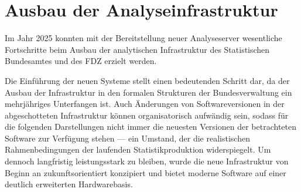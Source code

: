 \documentclass[
  german,
  10pt,
  twoside]{article}
\makeatletter
\newcommand{\berlintime}{%
  \berlinhr=\time\relax
  \divide\berlinhr by 60\relax
  \berlinmin=\time\relax
  \multiply\berlinhr by -60\relax
  \advance\berlinmin by \berlinhr\relax
  \berlinhr=\time\relax
  \divide\berlinhr by 60\relax
  \advance\berlinhr by 1\relax
  \ifnum\berlinhr>23\relax
    \advance\berlinhr by -24\relax
  \fi
  \ifnum\berlinhr<10 0\fi\the\berlinhr:\ifnum\berlinmin<10 0\fi\the\berlinmin%
}
\newif\ifdraftmode
\providecommand{\totalchars}{0}
\providecommand{\totalwords}{0}
\providecommand{\abstractchars}{0}
\providecommand{\abstractwords}{0}
\providecommand{\zusammenfassungchars}{0}
\providecommand{\zusammenfassungwords}{0}
\providecommand{\footnotecountnum}{0}
\providecommand{\citationcountnum}{0}
\providecommand{\schlusselwortercount}{0}
\providecommand{\keywordscount}{0}
\providecommand{\authoronechars}{0}
\providecommand{\authortwochars}{0}
\newcommand{\doctitle}{$title$}
\newcommand{\docauthors}{$author-short$}
\newcommand{\docpublication}{$publication$}
\newcommand{\docpublicationissue}{$publication-issue$}
\newcommand{\checkreq}[2]{%
  \StrDel{#1}{ }[\cleanvalue]%
  \IfStrEq{\cleanvalue}{0}{%
    \textcolor{red}{\ding{55}}%
  }{%
    \newcount\actualval%
    \newcount\maxval%
    \actualval=\cleanvalue\relax%
    \maxval=#2\relax%
    \multiply\maxval by 6\relax%
    \divide\maxval by 5\relax%
    \ifnum\actualval>\maxval\relax
      \textcolor{red}{\ding{55}}%
    \else
      \textcolor{green!60!black}{\checkmark}%
    \fi
  }%
}
\newcommand{\checkkeywords}[1]{%
  \ifnum#1>5\relax
    \textcolor{red}{\ding{55}}%
  \else%
    \textcolor{green!60!black}{\checkmark}%
  \fi%
}
\newcommand{\metadatapage}{%
  \clearpage
  \thispagestyle{empty}
  \onecolumn
  \vspace*{1.5cm}
  
  {\raggedright
  {\LARGE\bfseries\color{wistaBlue} Dokument-Metadaten}\\[0.5cm]
  
  \begin{tabular}{@{}ll}
    \textbf{Titel:} & \doctitle \\[0.3em]
    \textbf{Autoren:} & \docauthors \\[0.3em]
    \textbf{Veröffentlichung:} & \docpublication\ \docpublicationissue \\[0.3em]
    \textbf{Erstellungsdatum:} & \today\ um \berlintime\ Uhr \\[0.3em]
  \end{tabular}
  
  \vspace{0.5cm}
  {\color{wistaBlue}\rule{\textwidth}{1pt}}
  \par}
  
  \vspace{1cm}
  
  {\large\bfseries\color{wistaDarkGray} Dokumentstatistik}\\[0.5cm]
  
  \small
  \begin{tabular}{@{}lrrrrrl@{}}
    \toprule
    \textbf{Abschnitt} & \textbf{Wörter} & \textbf{Zeichen} & \textbf{Fußn.} & \textbf{Quellen} & \textbf{Vorgabe} & \textbf{Status} \\
    \midrule
    Insgesamt & \textcolor{wistaBlue}{\textbf{\totalwords}} & \textcolor{wistaBlue}{\textbf{\totalchars}} & \textcolor{wistaBlue}{\textbf{\footnotecountnum}} & \textcolor{wistaBlue}{\textbf{\citationcountnum}} & 30\,000 Z. & \checkreq{\totalchars}{30000} \\
    Zusammenfassung & \textcolor{wistaBlue}{\textbf{\zusammenfassungwords}} & \textcolor{wistaBlue}{\textbf{\zusammenfassungchars}} & --- & --- & 800 Z. & \checkreq{\zusammenfassungchars}{800} \\
    Abstract & \textcolor{wistaBlue}{\textbf{\abstractwords}} & \textcolor{wistaBlue}{\textbf{\abstractchars}} & --- & --- & 700 Z. & \checkreq{\abstractchars}{700} \\
    Autor 1 (O. Hauke) & --- & \textcolor{wistaBlue}{\textbf{\authoronechars}} & --- & --- & 350 Z. & \checkreq{\authoronechars}{350} \\
    Autor 2 (A. Kristiansen) & --- & \textcolor{wistaBlue}{\textbf{\authortwochars}} & --- & --- & 350 Z. & \checkreq{\authortwochars}{350} \\
    \midrule
    \sectionrows
    \bottomrule
  \end{tabular}
  \normalsize
  
  \vspace{0.5cm}
  
  {\large\bfseries\color{wistaDarkGray} Schlüsselwörter ($\leq$ 5) \checkkeywords{\schlusselwortercount}}\\[0.3cm]
  \small
  \schlusselworterlist
  \normalsize
  
  \vspace{0.5cm}
  
  {\large\bfseries\color{wistaDarkGray} Keywords ($\leq$ 5) \checkkeywords{\keywordscount}}\\[0.3cm]
  \small
  \keywordslist
  \normalsize
  
  \vspace{1cm}
  
  {\large\bfseries\color{wistaDarkGray} Tabellen (\total{table})}\\[0.3cm]
  
  \small
  \begin{tabular}{@{}p{3cm}p{11cm}@{}}
    \toprule
    \textbf{Nr.} & \textbf{Beschreibung} \\
    \midrule
    \tablerows
    \bottomrule
  \end{tabular}
  \normalsize
  
  \vspace{1cm}
  
  {\large\bfseries\color{wistaDarkGray} Abbildungen (\total{figure})}\\[0.3cm]
  
  \small
  \begin{tabular}{@{}p{3cm}p{11cm}@{}}
    \toprule
    \textbf{Nr.} & \textbf{Beschreibung} \\
    \midrule
    \figurerows
    \bottomrule
  \end{tabular}
  \normalsize
  
  \clearpage
}
\let\oldtextbf\textbf
\renewcommand{\textbf}[1]{{\color{wistaBlue}\oldtextbf{#1}}}
\makeatother
\begin{document}
\newcommand{\tablerows}{            \hyperref[tbl-stba-rserver]{Tabelle~1} & StBA R-Server Ausbau (Anfang 2025) \\
            \hyperref[tbl-fdz-server]{Tabelle~2} & FDZ OnSite-Server Spezifikationen \\
            \hyperref[tbl-pkg-versions]{Tabelle~3} & Versionen verfügbarer R-Packages \\
            \hyperref[tbl-baseline]{Tabelle~4} & Baselines in SAS und Stata (anhand 1\% des simuliertes BTP) \\
            \hyperref[tbl-benchmark-small]{Tabelle~5} & Performanz Messungen für die Fallzahlberechnung anhand 1\% des BTP \\
            \hyperref[tbl-benchmark-regr-small]{Tabelle~6} & Performanz Messungen für die Regressionsberechnung anhand 1\% des BTP \\
            \hyperref[tbl-benchmark]{Tabelle~7} & Performanz Messungen für die Fallzahlberechnung anhand 10\% des BTP \\
            \hyperref[tbl-benchmark-regr]{Tabelle~8} & Performanz Messungen für die Regressionsberechnung anhand 10\% des BTP \\
            \hyperref[tbl-bm-cnt-small]{Tabelle~9} & Benchmarkergebnisse für Fallzahlen (kleine Stichproben des BTP) \\
            \hyperref[tbl-bm-reg-small]{Tabelle~10} & Benchmarkergebnisse für Regression (kleine Stichproben des BTP) \\
}
\newcommand{\figurerows}{            \hyperref[fig-optimization-strategies]{Abbildung~1} & Strategien zur Performanz-Optimierung im FDZ-Bund \\
}
\newcommand{\schlusselworterlist}{}
\newcommand{\keywordslist}{}
\ifdraftmode
\metadatapage
\fi

\section{Ausbau der Analyseinfrastruktur}\label{sec-infrastruktur}

Im Jahr 2025 konnten mit der Bereitstellung neuer Analyseserver
wesentliche Fortschritte beim Ausbau der analytischen Infrastruktur des
Statistischen Bundesamtes und des FDZ erzielt werden.

Die Einführung der neuen Systeme stellt einen bedeutenden Schritt dar,
da der Ausbau der Infrastruktur in den formalen Strukturen der
Bundesverwaltung ein mehrjähriges Unterfangen ist. Auch Änderungen von
Softwareversionen in der abgeschotteten Infrastruktur können
organisatorisch aufwändig sein, sodass für die folgenden Darstellungen
nicht immer die neuesten Versionen der betrachteten Software zur
Verfügung stehen --- ein Umstand, der die realistischen
Rahmenbedingungen der laufenden Statistikproduktion widerspiegelt. Um
dennoch langfristig leistungsstark zu bleiben, wurde die neue
Infrastruktur von Beginn an zukunftsorientiert konzipiert und bietet
moderne Software auf einer deutlich erweiterten Hardwarebasis.
\end{document}
